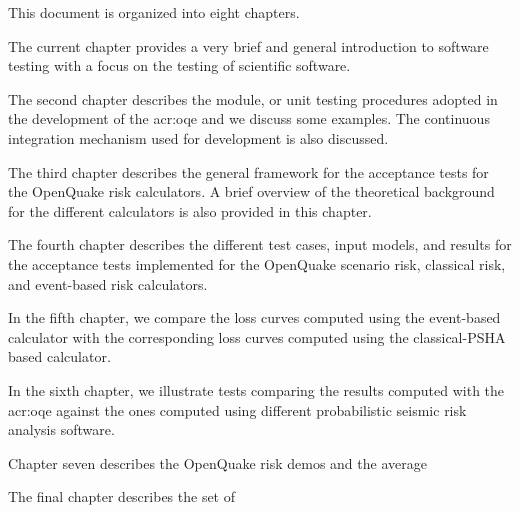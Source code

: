 This document is organized into eight chapters.

The current chapter provides a very brief and general introduction to software testing with a focus on the testing of scientific software.

The second chapter describes the module, or unit testing procedures adopted in the development of the \gls{acr:oqe} and we discuss some examples. The continuous integration mechanism used for development is also discussed.

The third chapter describes the general framework for the acceptance tests for the OpenQuake risk calculators. A brief overview of the theoretical background for the different calculators is also provided in this chapter.

The fourth chapter describes the different test cases, input models, and results for the acceptance tests implemented for the OpenQuake scenario risk, classical risk, and event-based risk calculators.

In the fifth chapter, we compare the loss curves computed using the event-based calculator with the corresponding loss curves computed using the classical-PSHA based calculator.

In the sixth chapter, we illustrate tests comparing the results computed with the \gls{acr:oqe} against the ones computed using different probabilistic seismic risk analysis software.

Chapter seven describes the OpenQuake risk demos and the average 

The final chapter describes the set of 